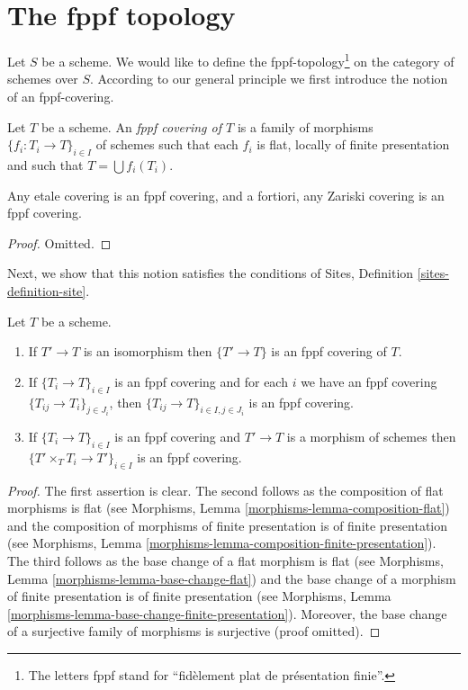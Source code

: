 \section{The fppf topology}
\label{section-fppf}

\noindent
Let $S$ be a scheme. We would like to define the fppf-topology\footnote{
The letters fppf stand for ``fid\`element plat de pr\'esentation finie''.} on
the category of schemes over $S$. According to our general principle
we first introduce the notion of an fppf-covering.

\begin{definition}
\label{definition-fppf-covering}
Let $T$ be a scheme. An {\it fppf covering of $T$} is a family
of morphisms $\{f_i : T_i \to T\}_{i \in I}$ of schemes
such that each $f_i$ is flat, locally of finite presentation and such
that $T = \bigcup f_i(T_i)$.
\end{definition}

\begin{lemma}
\label{lemma-zariski-etale-fppf}
Any etale covering is an fppf covering, and a fortiori,
any Zariski covering is an fppf covering.
\end{lemma}

\begin{proof}
Omitted.
\end{proof}

\noindent
Next, we show that this notion satisfies the conditions of
Sites, Definition \ref{sites-definition-site}.

\begin{lemma}
\label{lemma-fppf}
Let $T$ be a scheme.
\begin{enumerate}
\item If $T' \to T$ is an isomorphism then $\{T' \to T\}$
is an fppf covering of $T$.
\item If $\{T_i \to T\}_{i\in I}$ is an fppf covering and for each
$i$ we have an fppf covering $\{T_{ij} \to T_i\}_{j\in J_i}$, then
$\{T_{ij} \to T\}_{i \in I, j\in J_i}$ is an fppf covering.
\item If $\{T_i \to T\}_{i\in I}$ is an fppf covering
and $T' \to T$ is a morphism of schemes then
$\{T' \times_T T_i \to T'\}_{i\in I}$ is an fppf covering.
\end{enumerate}
\end{lemma}

\begin{proof}
The first assertion is clear.
The second follows as the composition of flat morphisms is flat
(see Morphisms, Lemma \ref{morphisms-lemma-composition-flat})
and the composition of morphisms of finite presentation is
of finite presentation
(see Morphisms, Lemma \ref{morphisms-lemma-composition-finite-presentation}).
The third follows as the base change of a flat morphism is flat
(see Morphisms, Lemma \ref{morphisms-lemma-base-change-flat})
and the base change of a morphism of finite presentation is
of finite presentation
(see Morphisms, Lemma \ref{morphisms-lemma-base-change-finite-presentation}).
Moreover, the base change of a surjective family of morphisms is surjective
(proof omitted).
\end{proof}

